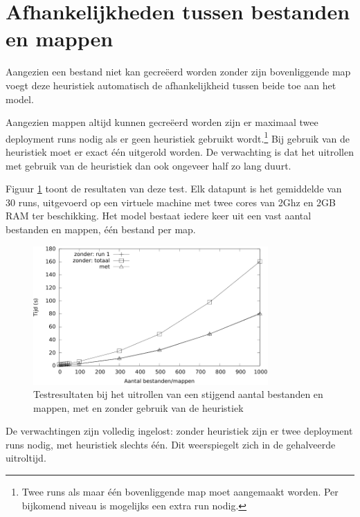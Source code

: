
\section{Afhankelijkheden tussen bestanden en mappen}
\label{sec:bestanden_en_mappen_eval}
Aangezien een bestand niet kan gecre\"eerd worden zonder zijn bovenliggende map voegt deze heuristiek automatisch de afhankelijkheid tussen beide toe aan het model.

Aangezien mappen altijd kunnen gecre\"eerd worden zijn er maximaal twee deployment runs nodig als er geen heuristiek gebruikt wordt.\footnote{Twee runs als maar \'e\'en bovenliggende map moet aangemaakt worden. Per bijkomend niveau is mogelijks een extra run nodig.}
Bij gebruik van de heuristiek moet er exact \'e\'en uitgerold worden.
De verwachting is dat het uitrollen met gebruik van de heuristiek dan ook ongeveer half zo lang duurt.

Figuur \ref{fig:file_dir_times} toont de resultaten van deze test.
Elk datapunt is het gemiddelde van 30 runs, uitgevoerd op een virtuele machine met twee cores van 2Ghz en 2GB RAM ter beschikking.
Het model bestaat iedere keer uit een vast aantal bestanden en mappen, \'e\'en bestand per map.
\begin{figure}[h]
    \begin{center}
    \includegraphics[width=0.8\textwidth]{images/file_dir_times.pdf}
    \caption{Testresultaten bij het uitrollen van een stijgend aantal bestanden en mappen, met en zonder gebruik van de heuristiek}
    \label{fig:file_dir_times}
    \end{center}
\end{figure}

De verwachtingen zijn volledig ingelost: zonder heuristiek zijn er twee deployment runs nodig, met heuristiek slechts \'e\'en.
Dit weerspiegelt zich in de gehalveerde uitroltijd.

